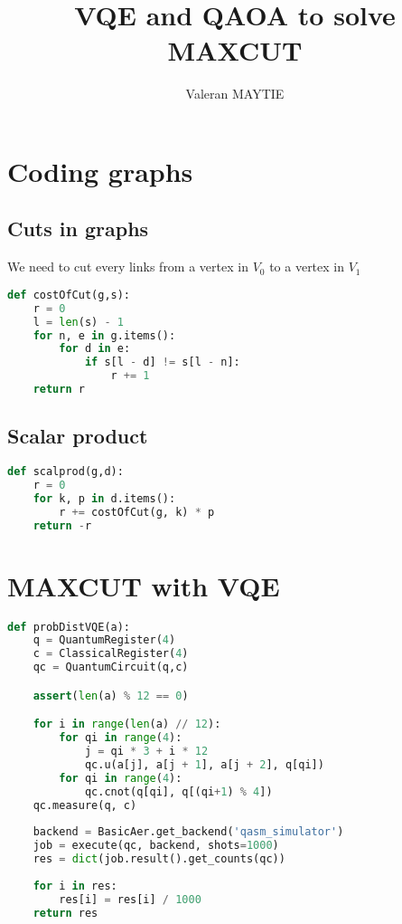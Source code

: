 \documentclass{article}
\title{VQE and QAOA to solve MAXCUT}
\author{Valeran MAYTIE}
\date{}
\theoremstyle{plain}
\begin{document}
  \maketitle

  \section{Coding graphs}

    \subsection{Cuts in graphs}

      We need to cut every links from a vertex in $V_0$ to a vertex in $V_1$\\

      \begin{lstlisting}[language=python, label=code:cuts,
                     caption=Code that computes the cost of a cut $s$ in a graph
                     $g$]
def costOfCut(g,s):
    r = 0
    l = len(s) - 1
    for n, e in g.items():
        for d in e:
            if s[l - d] != s[l - n]:
                r += 1
    return r\end{lstlisting}

    \subsection{Scalar product}

      \begin{lstlisting}[language=python, label=code:cuts,
                     caption=Code that computes the scalar product who whant to
                     optimize]
def scalprod(g,d):
    r = 0
    for k, p in d.items():
        r += costOfCut(g, k) * p
    return -r\end{lstlisting}

  \section{MAXCUT with VQE}

    \begin{lstlisting}[language=python, label=code:VQE,
                     caption=code that creates and simulates the VQE circuit]
def probDistVQE(a):
    q = QuantumRegister(4)
    c = ClassicalRegister(4)
    qc = QuantumCircuit(q,c)

    assert(len(a) % 12 == 0)

    for i in range(len(a) // 12):
        for qi in range(4):
            j = qi * 3 + i * 12
            qc.u(a[j], a[j + 1], a[j + 2], q[qi])
        for qi in range(4):
            qc.cnot(q[qi], q[(qi+1) % 4])  
    qc.measure(q, c)
    
    backend = BasicAer.get_backend('qasm_simulator')
    job = execute(qc, backend, shots=1000)
    res = dict(job.result().get_counts(qc))
    
    for i in res:
        res[i] = res[i] / 1000
    return res\end{lstlisting}
\end{document}
